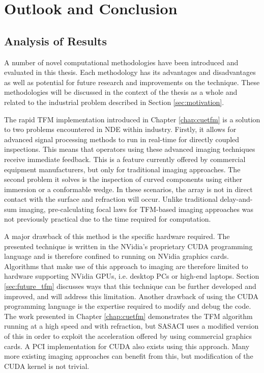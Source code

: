 \chapter{Outlook and Conclusion}

\section{Analysis of Results}
A number of novel computational methodologies have been introduced and evaluated in this thesis. Each methodology has its advantages and disadvantages as well as potential for future research and improvements on the technique. These methodologies will be discussed in the context of the thesis as a whole and related to the industrial problem described in Section \ref{sec:motivation}.

The rapid TFM implementation introduced in Chapter \ref{chap:cuetfm} is a solution to two problems encountered in NDE within industry. Firstly, it allows for advanced signal processing methods to run in real-time for directly coupled inspections. This means that operators using these advanced imaging techniques receive immediate feedback. This is a feature currently offered by commercial equipment manufacturers, but only for traditional imaging approaches. The second problem it solves is the inspection of curved components using either immersion or a conformable wedge. In these scenarios, the array is not in direct contact with the surface and refraction will occur. Unlike traditional delay-and-sum imaging, pre-calculating focal laws for TFM-based imaging approaches was not previously practical due to the time required for computation. 

A major drawback of this method is the specific hardware required. The presented technique is written in the NVidia's proprietary CUDA programming language and is therefore confined to running on NVidia graphics cards. Algorithms that make use of this approach to imaging are therefore limited to hardware supporting NVidia GPUs, i.e. desktop PCs or high-end laptops. Section \ref{sec:future_tfm} discusses ways that this technique can be further developed and improved, and will address this limitation. Another drawback of using the CUDA programming language is the expertise required to modify and debug the code. The work presented in Chapter \ref{chap:cuetfm} demonstrates the TFM algorithm running at a high speed and with refraction, but SASACI uses a modified version of this in order to exploit the acceleration offered by using commercial graphics cards. A PCI\cite{camacho_phase_2009} implementation for CUDA also exists using this approach. Many more existing imaging approaches can benefit from this, but modification of the CUDA kernel is not trivial. 

